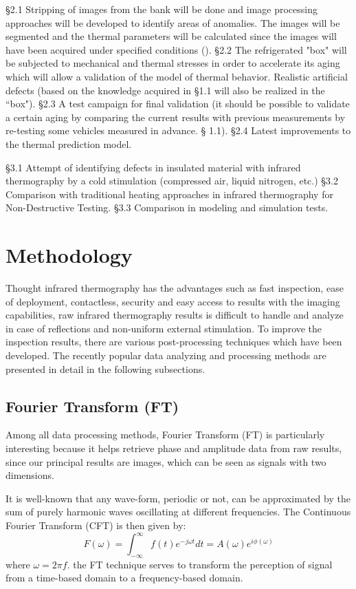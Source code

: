\S 2.1 Stripping of images from the bank will be done and image processing approaches will be developed to identify areas of anomalies. The images will be segmented and the thermal parameters will be calculated since the images will have been acquired under specified conditions (\citet{Ibarra-Castanedo2013Methods}). §2.2 The refrigerated "box" will be subjected to mechanical and thermal stresses in order to accelerate its aging which will allow a validation of the model of thermal behavior. Realistic artificial defects (based on the knowledge acquired in §1.1 will also be realized in the ``box"). §2.3 A test campaign for final validation (it should be possible to validate a certain aging by comparing the current results with previous measurements by re-testing some vehicles measured in advance. § 1.1). §2.4 Latest improvements to the thermal prediction model.

\S 3.1 Attempt of identifying defects in insulated material with infrared thermography by a cold stimulation (compressed air, liquid nitrogen, etc.) \S 3.2 Comparison with traditional heating approaches in infrared thermography for Non-Destructive Testing. \S 3.3 Comparison in modeling and simulation tests.

\section{Methodology}
Thought infrared thermography has the advantages such as fast inspection, ease of deployment, contactless, security and easy access to results with the imaging capabilities, raw infrared thermography results is difficult to handle and analyze in case of reflections and non-uniform external stimulation. To improve the inspection results, there are various post-processing techniques which have been developed. The recently popular data analyzing and processing methods are presented in detail in the following subsections.
\subsection{Fourier Transform (FT)}
Among all data processing methods, Fourier Transform (FT) is particularly interesting because it helps retrieve phase and amplitude data from raw results, since our principal results are images, which can be seen as signals with two dimensions.

It is well-known that any wave-form, periodic or not, can be approximated by the sum of purely harmonic waves oscillating at different frequencies. The Continuous Fourier Transform (CFT) is then given by:
\begin{equation}
F(\omega) = \int_{-\infty}^{\infty}f(t)e^{-j\omega t}dt = A(\omega)e^{i\phi(\omega)}
\end{equation}
where $\omega = 2 \pi f$. the FT technique serves to transform the perception of signal from a time-based domain to a frequency-based domain.


